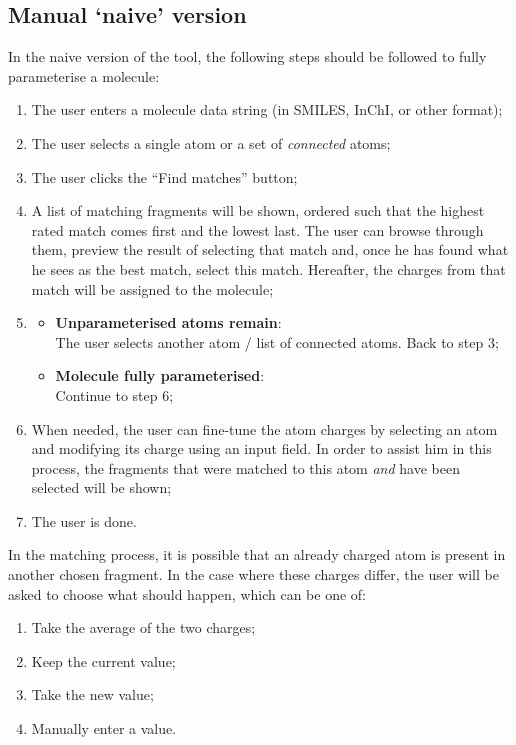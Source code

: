 \subsection{Manual `naive' version}
In the naive version of the tool, the following steps should be followed to fully parameterise a molecule:
\begin{enumerate}[itemsep=.1em, parsep=.2em, topsep=0em]
\item The user enters a molecule data string (in SMILES, InChI, or other format);
\item The user selects a single atom or a set of \emph{connected} atoms;
\item The user clicks the ``Find matches'' button;
\item A list of matching fragments will be shown, ordered such that the highest rated match comes first and the lowest last. The user can browse through them, preview the result of selecting that match and, once he has found what he sees as the best match, select this match. Hereafter, the charges from that match will be assigned to the molecule;
\item
\begin{itemize}[leftmargin=0cm, itemsep=.1em, parsep=.1em]
\item[]{\bf Unparameterised atoms remain}:\\The user selects another atom / list of connected atoms. Back to step 3;
\item[] {\bf Molecule fully parameterised}:\\Continue to step 6;
\end{itemize}
\item When needed, the user can fine-tune the atom charges by selecting an atom and modifying its charge using an input field. In order to assist him in this process, the fragments that were matched to this atom \emph{and} have been selected will be shown;
\item The user is done.
\end{enumerate}

\noindent
In the matching process, it is possible that an already charged atom is present in another chosen fragment. In the case where these charges differ, the user will be asked to choose what should happen, which can be one of:
\begin{enumerate}[itemsep=.1em, parsep=.2em, topsep=0em]
\item Take the average of the two charges;
\item Keep the current value;
\item Take the new value;
\item Manually enter a value.
\end{enumerate}


